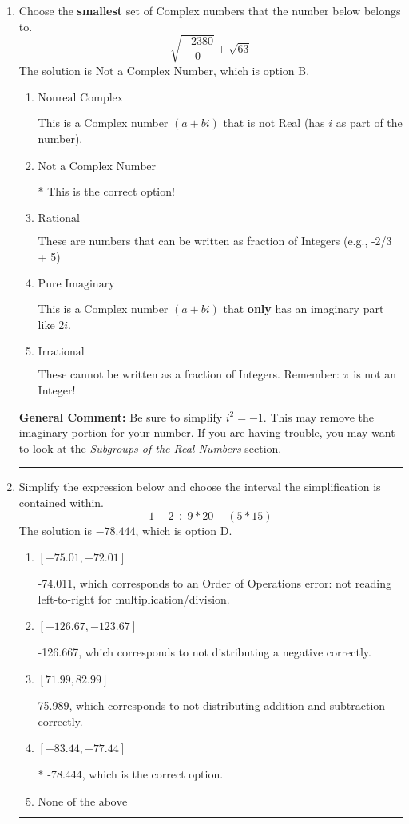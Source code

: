 \documentclass{extbook}[14pt]
\newcommand{\litem}[1]{\item #1

\rule{\textwidth}{0.4pt}}
\begin{document}
\begin{enumerate}\litem{
Choose the \textbf{smallest} set of Complex numbers that the number below belongs to.
\[ \sqrt{\frac{-2380}{0}}+\sqrt{63} \]The solution is \( \text{Not a Complex Number} \), which is option B.\begin{enumerate}[label=\Alph*.]
\item \( \text{Nonreal Complex} \)

This is a Complex number $(a+bi)$ that is not Real (has $i$ as part of the number).
\item \( \text{Not a Complex Number} \)

* This is the correct option!
\item \( \text{Rational} \)

These are numbers that can be written as fraction of Integers (e.g., -2/3 + 5)
\item \( \text{Pure Imaginary} \)

This is a Complex number $(a+bi)$ that \textbf{only} has an imaginary part like $2i$.
\item \( \text{Irrational} \)

These cannot be written as a fraction of Integers. Remember: $\pi$ is not an Integer!
\end{enumerate}

\textbf{General Comment:} Be sure to simplify $i^2 = -1$. This may remove the imaginary portion for your number. If you are having trouble, you may want to look at the \textit{Subgroups of the Real Numbers} section.
}
\litem{
Simplify the expression below and choose the interval the simplification is contained within.
\[ 1 - 2 \div 9 * 20 - (5 * 15) \]The solution is \( -78.444 \), which is option D.\begin{enumerate}[label=\Alph*.]
\item \( [-75.01, -72.01] \)

 -74.011, which corresponds to an Order of Operations error: not reading left-to-right for multiplication/division.
\item \( [-126.67, -123.67] \)

 -126.667, which corresponds to not distributing a negative correctly.
\item \( [71.99, 82.99] \)

 75.989, which corresponds to not distributing addition and subtraction correctly.
\item \( [-83.44, -77.44] \)

* -78.444, which is the correct option.
\item \( \text{None of the above} \)


\end{enumerate}}
\end{enumerate}
\end{document}
